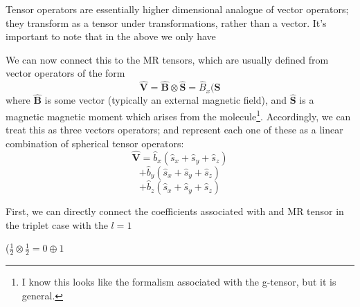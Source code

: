 \documentclass[12pt]{article}
\begin{document}
\noindent Tensor operators are essentially higher dimensional analogue of
vector operators; they transform as a tensor under transformations,
rather than a vector. It's important to note that in the above we
only have 


\noindent We can now connect this to the MR tensors, which
are usually defined from vector operators of the form
\begin{equation}
\mathbf{\hat{V}} = \mathbf{\hat{B}}\otimes\mathbf{\hat{S}}
=\hat{B}_{x}(\mathbf{S}
\end{equation}
where $\mathbf{\hat{B}}$ is some vector (typically an external
magnetic field), and $\mathbf{\hat{S}}$ is a magnetic magnetic moment
which arises from the molecule\footnote{I know
this looks like the formalism associated with the g-tensor, but
it is general.}. Accordingly,
we can treat this as three vectors operators; and represent each one
of these as a linear combination of spherical tensor operators:
\begin{equation*}
\mathbf{\hat{V}} = \hat{b}_{x}(\hat{s}_{x}+\hat{s}_{y}+\hat{s}_{z})
\end{equation*}
\begin{equation*}
+                 \hat{b}_{y}(\hat{s}_{x}+\hat{s}_{y}+\hat{s}_{z})
\end{equation*}
\begin{equation}
+                 \hat{b}_{z}(\hat{s}_{x}+\hat{s}_{y}+\hat{s}_{z})
\end{equation}


 First, we can directly connect the coefficients associated with 
and MR tensor in the triplet case with the $l=1$ 




($\frac{1}{2}\otimes\frac{1}{2} = 0\oplus1$
\end{document}
